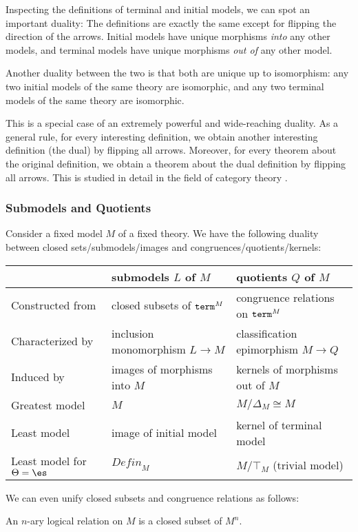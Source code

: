 Inspecting the definitions of terminal and initial models, we can spot an important duality:
The definitions are exactly the same except for flipping the direction of the arrows.
Initial models have unique morphisms \emph{into} any other models, and terminal models have unique morphisms \emph{out of} any other model.

Another duality between the two is that both are unique up to isomorphism: any two initial models of the same theory are isomorphic, and any two terminal models of the same theory are isomorphic.

This is a special case of an extremely powerful and wide-reaching duality.
As a general rule, for every interesting definition, we obtain another interesting definition (the dual) by flipping all arrows.
Moreover, for every theorem about the original definition, we obtain a theorem about the dual definition by flipping all arrows.
This is studied in detail in the field of category theory \cite{categories,categories_awodey}.

\subsubsection{Submodels and Quotients}\label{sec:univ:meta:subquot}

Consider a fixed model $M$ of a fixed theory.
We have the following duality between closed sets/submodels/images and congruences/quotients/kernels:

\begin{center}
\begin{tabular}{|l||l|l|}
\hline
 & submodels $L$ of $M$& quotients $Q$ of $M$ \\
\hline
Constructed from & closed subsets of $\mathtt{term}^M$ & congruence relations on $\mathtt{term}^M$ \\
Characterized by & inclusion monomorphism $L\to M$ & classification epimorphism $M\to Q$ \\
Induced by & images of morphisms into $M$ & kernels of morphisms out of $M$ \\
Greatest model & $M$ & $M/\Delta_M\cong M$ \\
Least model & image of initial model & kernel of terminal model \\
Least model for $\Theta=\es$ & $\mathit{Defin}_M$ & $M/\top_M$ (trivial model) \\
\hline
\end{tabular}
\end{center}

We can even unify closed subsets and congruence relations as follows:
\begin{definition}
An $n$-ary logical relation on $M$ is a closed subset of $M^n$.
\end{definition}

